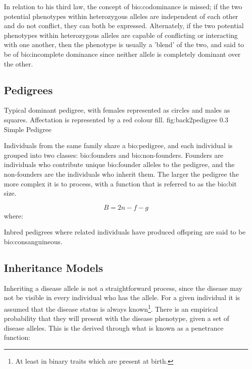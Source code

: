 In relation to his third law, the concept of \gls{bio:codominance} is missed; if the two potential phenotypes within heterozygous alleles are independent of each other and do not conflict, they can both be expressed. Alternately, if the two potential phenotypes within heterozygous alleles are capable of conflicting or interacting with one another, then the phenotype is usually a 'blend' of the two, and said to be of \gls{bio:incomplete dominance} since neither allele is completely dominant over the other.


\subsection{Pedigrees}

	{Typical dominant pedigree, with females represented as circles and males as squares. Affectation is represented by a red colour fill.}
	{fig:back2pedigree}
	{0.3}
	{Simple Pedigree}

Individuals from the same family share a \gls{bio:pedigree}, and each individual is grouped into two classes: \gls{bio:founders} and \gls{bio:non-founders}. 
Founders are individuals who contribute unique \gls{bio:founder alleles} to the pedigree, and the non-founders are the individuals who inherit them.
The larger the pedigree the more complex it is to process, with a function that is referred to as the \gls{bio:bit size}.

\begin{equation}
\label{eqn:bitsize}
B = 2n -f -g
\end{equation}
where:

\begin{description}
\end{description}

Inbred pedigrees where related individuals have produced offspring are said to be \gls{bio:consanguineous}.


\subsection{Inheritance Models}

Inheriting a disease allele is not a straightforward process, since the disease may not be visible in every individual who has the allele. For a given individual it is assumed that the disease status is always known\footnote{At least in binary traits which are present at birth.}.  There is an empirical probability that they will present with the disease phenotype, given a set of disease alleles. This is the derived through what is known as a penetrance function:

